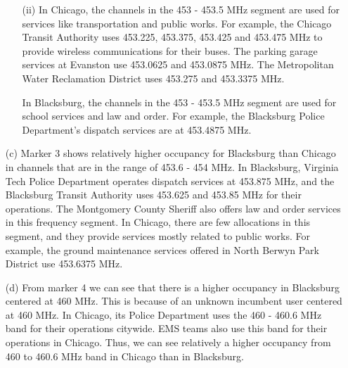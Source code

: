 \documentclass[12pt,sts]{report}
\begin{document}
\begin{enumerate}
\begin{enumerate}
				\item[(ii)] In Chicago, the channels in the 453 - 453.5 MHz segment are used for services like transportation and public works. For example, the Chicago Transit Authority uses 453.225, 453.375, 453.425 and 453.475 MHz to provide wireless communications for their buses. The parking garage services at Evanston use 453.0625 and 453.0875 MHz. The Metropolitan Water Reclamation District uses 453.275 and 453.3375 MHz.
				
				In Blacksburg, the channels in the 453 - 453.5 MHz segment are used for school services and law and order. For example, the Blacksburg Police Department's dispatch services are at 453.4875 MHz.
				
			\end{enumerate}
			
			\item[(c)] Marker 3 shows relatively higher occupancy for Blacksburg than Chicago in channels that are in the range of 453.6 - 454 MHz. In Blacksburg, Virginia Tech Police Department operates dispatch services at 453.875 MHz, and the Blacksburg Transit Authority uses 453.625 and 453.85 MHz for their operations. The Montgomery County Sheriff also offers law and order services in this frequency segment. In Chicago, there are few allocations in this segment, and they provide services mostly related to public works. For example, the ground maintenance services offered in North Berwyn Park District use 453.6375 MHz.
			
			
			\item[(d)] From marker 4 we can see that there is a higher occupancy in Blacksburg centered at 460 MHz. This is because of an unknown incumbent user centered at 460 MHz. In Chicago, its Police Department uses the 460 - 460.6 MHz band for their operations citywide. EMS teams also use this band for their operations in Chicago. Thus, we can see relatively a higher occupancy from 460 to 460.6 MHz band in Chicago than in Blacksburg.
			
	\end{enumerate}
	
\end{document}
